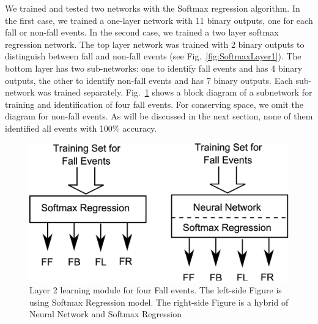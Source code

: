 \documentclass[]{IEEEtran}
\begin{document}
We trained and tested two networks with the Softmax regression algorithm. In the first case, we trained a one-layer network with 11 binary outputs, one for each fall or non-fall events. In the second case, we trained a two layer softmax regression network. The top layer network was trained with 2 binary outputs to distinguish between fall and non-fall events (see Fig.~\ref{fig:SoftmaxLayer1}). The bottom layer has two sub-networks:  one to identify fall events and has 4 binary outputs, the other to identify non-fall events and has 7 binary outputs. Each sub-network was trained separately. Fig.~\ref{fig:SoftmaxLayer2Fall} shows a block diagram of a subnetwork for training and identification of four fall events. For conserving space, we omit the diagram for non-fall events. As will be discussed in the next section, none of them identified all events with 100\% accuracy.

\begin{figure}[htbp]
	\centering
		\includegraphics[width=0.75\columnwidth]{figures/SoftmaxLayer2Fall.eps}
	\caption{Layer 2 learning module for four Fall events. The left-side Figure is using Softmax Regression model. The right-side Figure is a hybrid of Neural Network and Softmax Regression }
	\label{fig:SoftmaxLayer2Fall}
\end{figure}

\end{document}
